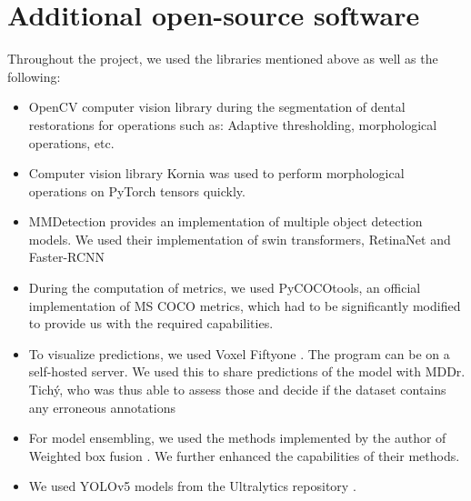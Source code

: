 \section{Additional open-source software}
Throughout the project, we used the libraries mentioned above as well as the following:
\begin{itemize}
    \item OpenCV \cite{opencv_library}  computer vision library during the segmentation of dental restorations for operations such as: Adaptive thresholding, morphological operations, etc.
    \item Computer vision library Kornia \cite{eriba2019kornia} was used to perform morphological operations on PyTorch tensors quickly.
    \item MMDetection \cite{mmdetection} provides an implementation of multiple object detection models. We used their implementation of swin transformers, RetinaNet and Faster-RCNN
    \item During the computation of metrics, we used PyCOCOtools, an official \cite{pycocotools} implementation of MS COCO metrics, which had to be significantly modified to provide us with the required capabilities.
    \item To visualize predictions, we used Voxel Fiftyone \cite{moorefiftyone}. The program can be on a self-hosted server. We used this to share predictions of the model with MDDr. Tichý, who was thus able to assess those and decide if the dataset contains any erroneous annotations
    \item For model ensembling, we used the methods implemented by the author of Weighted box fusion \cite{Solovyev2019}. We further enhanced the capabilities of their methods.
    \item We used YOLOv5 models from the Ultralytics repository \cite{glennjocher2020}.
\end{itemize}